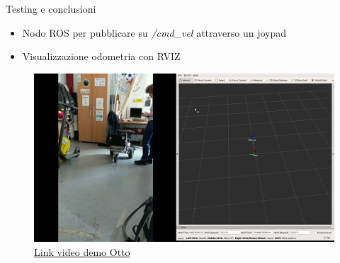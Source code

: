 \documentclass{beamer}
\begin{document}
\begin{tframe}{Testing e conclusioni}

\begin{itemize}
    \item Nodo ROS per pubblicare su \textit{/cmd\_vel} attraverso un joypad
    \item Visualizzazione odometria con RVIZ
\end{itemize}

\vspace{3mm}

\begin{figure}[h]
    \centering
    \includegraphics[scale=0.16]{img/demo.png}
    \caption*{\href{https://youtu.be/fEhBCXqMYPw}{Link video demo Otto}}
\end{figure}
\centering
\end{tframe}
\end{document}
